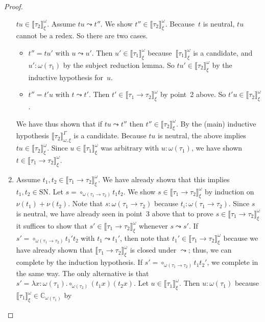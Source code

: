 \documentclass[runningheads,a4paper]{llncs}
\newcommand{\arrtype}{\rightarrow}
\newcommand{\abs}[2]{\lambda #1.#2}
\newcommand{\SN}{\mathrm{SN}}
\newcommand{\Cb}{\mathbb{C}}
\newcommand{\val}[3]{\ensuremath{\llbracket#1\rrbracket_{#2}^{#3}}}
\begin{document}
\begin{proof}
\begin{enumerate}
    $t u \in \val{\tau_2}{\xi}{\omega}$. Assume $t u \leadsto t''$. We
    show $t'' \in \val{\tau_2}{\xi}{\omega}$. Because~$t$ is neutral,
    $t u$ cannot be a redex. So there are two cases.
    \begin{itemize}
    \item $t'' = t u'$ with $u \leadsto u'$. Then $u' \in
      \val{\tau_1}{\xi}{\omega}$ because~$\val{\tau_1}{\xi}{\omega}$
      is a candidate, and~$u' : \omega(\tau_1)$ by the subject
      reduction lemma. So $t u' \in \val{\tau_2}{\xi}{\omega}$ by the
      inductive hypothesis for~$u$.
    \item $t'' = t' u$ with $t \leadsto t'$. Then $t' \in
      \val{\tau_1\arrtype\tau_2}{\xi}{\omega}$ by point~2 above. So
      $t' u \in \val{\tau_2}{\xi}{\omega}$.
    \end{itemize}
    We have thus shown that if $t u \leadsto t''$ then $t'' \in
    \val{\tau_2}{\xi}{\omega}$. By the (main) inductive hypothesis
    $\val{\tau_2}{\omega,\xi}{\Gamma}$ is a candidate. Because $t u$
    is neutral, the above implies $t u \in
    \val{\tau_2}{\xi}{\omega}$. Since $u \in
    \val{\tau_1}{\xi}{\omega}$ was arbitrary with $u :
    \omega(\tau_1)$, we have shown $t \in
    \val{\tau_1\arrtype\tau_2}{\xi}{\omega}$.
  \item Assume $t_1,t_2 \in \val{\tau_1\arrtype\tau_2}{\xi}{\omega}$.
    We have already shown that this implies $t_1,t_2 \in \SN$. Let $s
    = \circ_{\omega(\tau_1\arrtype\tau_2)} t_1 t_2$. We show $s \in
    \val{\tau_1\arrtype\tau_2}{\xi}{\omega}$ by induction on $\nu(t_1)
    + \nu(t_2)$. Note that $s : \omega(\tau_1\arrtype\tau_2)$ because
    $t_i : \omega(\tau_1\arrtype\tau_2)$. Since $s$ is neutral, we
    have already seen in point~3 above that to prove $s \in
    \val{\tau_1\arrtype\tau_2}{\xi}{\omega}$ it suffices to show that
    $s' \in \val{\tau_1\arrtype\tau_2}{\xi}{\omega}$ whenever $s
    \leadsto s'$. If $s' = \circ_{\omega(\tau_1\arrtype\tau_2)} t_1'
    t_2$ with $t_1 \leadsto t_1'$, then note that $t_1' \in
    \val{\tau_1\arrtype\tau_2}{\xi}{\omega}$ because we have already
    shown that $\val{\tau_1\arrtype\tau_2}{\xi}{\omega}$ is closed
    under $\leadsto$; thus, we can complete by the induction
    hypothesis. If $s' = \circ_{\omega(\tau_1\arrtype\tau_2)} t_1
    t_2'$, we complete in the same way.  The only alternative is that
    $s' = \abs{x:\omega(\tau_1)}{\circ_{\omega(\tau_2)}(t_1x)(t_2x)}$.
    Let $u \in \val{\tau_1}{\xi}{\omega}$. Then $u : \omega(\tau_1)$
    because $\val{\tau_1}{\xi}{\omega} \in \Cb_{\omega(\tau_1)}$ by

\end{enumerate}
\end{proof}
\end{document}

